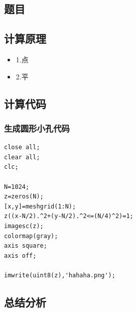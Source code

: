 \subsection{题目}
\subsection{计算原理}
\begin{itemize}
	\item 1.点
	\item 2.平
\end{itemize}
\subsection{计算代码}
\subsubsection{生成圆形小孔代码}
\begin{lstlisting}
close all;
clear all;
clc;

N=1024;
z=zeros(N);
[x,y]=meshgrid(1:N);
z((x-N/2).^2+(y-N/2).^2<=(N/4)^2)=1;
imagesc(z);
colormap(gray);
axis square;
axis off;

imwrite(uint8(z),'hahaha.png');
\end{lstlisting}



\subsection{总结分析}
